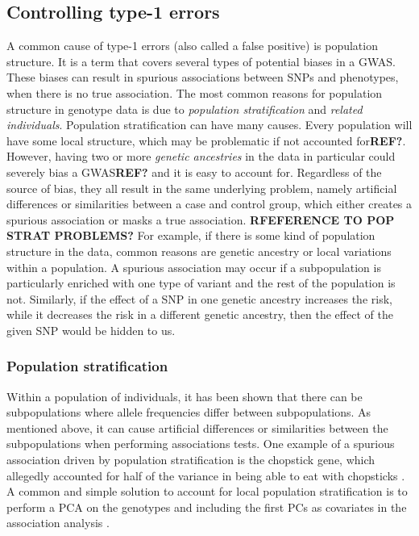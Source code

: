 \subsection{Controlling type-1 errors}
A common cause of type-1 errors (also called a false positive) is population structure. It is a term that covers several types of potential biases in a GWAS. These biases can result in spurious associations between SNPs and phenotypes, when there is no true association. The most common reasons for population structure in genotype data is due to \textit{population stratification} and \textit{related individuals}. Population stratification can have many causes. Every population will have some local structure, which may be problematic if not accounted for\textbf{REF?}. However, having two or more \textit{genetic ancestries} in the data in particular could severely bias a GWAS\textbf{REF?} and it is easy to account for. Regardless of the source of bias, they all result in the same underlying problem, namely artificial differences or similarities between a case and control group, which either creates a spurious association or masks a true association. \textbf{RFEFERENCE TO POP STRAT PROBLEMS?}
For example, if there is some kind of population structure in the data, common reasons are genetic ancestry or local variations within a population. A spurious association may occur if a subpopulation is particularly enriched with one type of variant and the rest of the population is not. Similarly, if the effect of a SNP in one genetic ancestry increases the risk, while it decreases the risk in a different genetic ancestry, then the effect of the given SNP would be hidden to us.

\subsubsection{Population stratification}
Within a population of individuals, it has been shown that there can be subpopulations where allele frequencies differ between subpopulations\cite{abdellaoui2013association,genome2014whole}. As mentioned above, it can cause artificial differences or similarities between the subpopulations when performing associations tests. One example of a spurious association driven by population stratification is the chopstick gene, which allegedly accounted for half of the variance in being able to eat with chopsticks \cite{marees2018tutorial,hamer2000beware}. A common and simple solution to account for local population stratification is to perform a PCA on the genotypes and including the first PCs as covariates in the association analysis \cite{price2006principal,price2010new,prive2020efficient}.

